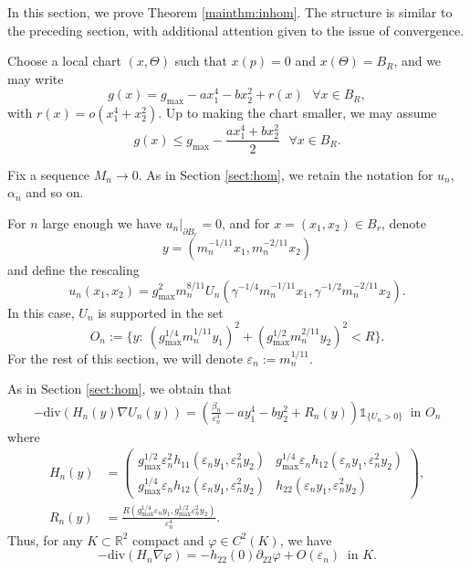 \documentclass[10pt,a4paper]{article}
\newcommand{\gmax}{g_{\mathrm{max}}}
\newcommand{\RR}{\mathbb{R}}
\newcommand{\divg}{\mathrm{div}}
\newcommand{\faskip}{\hspace{8pt}}
\numberwithin{equation}{section}
\begin{document}
In this section, we prove Theorem \ref{mainthm:inhom}. The structure is similar to the preceding section, with additional attention given to the issue of convergence.

Choose a local chart $ (x,\Theta) $ such that $x(p) = 0$ and $ x(\Theta) = B_R $, and we may write 
\[g(x) = \gmax  - a x_1^{4} - b x_2^{2}+ r(x) \faskip \forall x\in B_R,\]
with $r(x) = o(x_1^{4} +x_2^{2}) $. Up to making the chart smaller, we may assume 
\begin{equation} 
	\label{eq:hypothesis_degenerate}
	g(x) \leq \gmax -\frac{a x_1^4 + b x_2^2}{2} \faskip \forall x\in B_R.
\end{equation}

Fix a sequence $ M_n \rightarrow 0 $. As in Section \ref{sect:hom}, we retain the notation for $ u_n $, $ \alpha_n $ and so on.

For $n$ large enough we have $u_n |_{\partial B_r} = 0$, and for $ x= (x_1, x_2) \in B_r $, denote \[y = (m_n^{-1/11} x_1, m_n^{-2/11}x_2) \] and define the rescaling
\[
	u_n(x_1,x_2) = \gmax^2 m_n^{8/11} U_n(\gamma^{-1/4}m_n^{-1/11} x_1,  \gamma^{-1/2}m_n^{-2/11} x_2).
\]
In this case, $U_n$ is supported in the set
\[
	O_n:= \{y:~ (\gmax^{1/4}m_n^{1/11} y_1)^{2} + (\gmax^{1/2}m_n^{2/11}y_2)^{2} < R\}.
\]
For the rest of this section, we will denote $\varepsilon_n := m_n^{1/11}$.

As in Section \ref{sect:hom}, we obtain that 
\begin{align*}
	-\divg( H_{n}(y) \nabla U_{n}(y)) = \left( \frac{\beta_{n}}{\varepsilon_n^{4}} - ay_1^{4} - by_2^{2} + R_n(y)\right)\mathbb{1}_{\{U_{n} >0 \}} ~ \text{ in } O_{n} 
\end{align*}
where 
\begin{align*}
	H_{n}(y) &= \begin{pmatrix}
			\gmax^{1/2}\varepsilon_n^{2} h_{11}(\varepsilon_n y_1, \varepsilon_n^{2} y_2) & \gmax^{1/4}\varepsilon_n h_{12}(\varepsilon_n y_1, \varepsilon_n^{2} y_2) \\
			\gmax^{1/4}\varepsilon_n h_{12}(\varepsilon_n y_1, \varepsilon_n^{2} y_2) &  h_{22}(\varepsilon_n y_1, \varepsilon_n^{2} y_2)
		\end{pmatrix}, \\ 
		R_n(y) &= \frac{R(\gmax^{1/4}\varepsilon_n y_1, \gmax^{1/2}\varepsilon_n^{2} y_2)}{\varepsilon_n^{4}}.
\end{align*}
Thus, for any $K \subset \RR^{2}$ compact and $ \varphi \in C^{2}(K) $, we have 
\begin{equation}
	\label{eq:deg_asympt}
	-\divg(H_n \nabla \varphi) = -h_{22}(0) \partial_{22}\varphi + O(\varepsilon_n) ~ \text{ in } K.
\end{equation}
\end{document}
